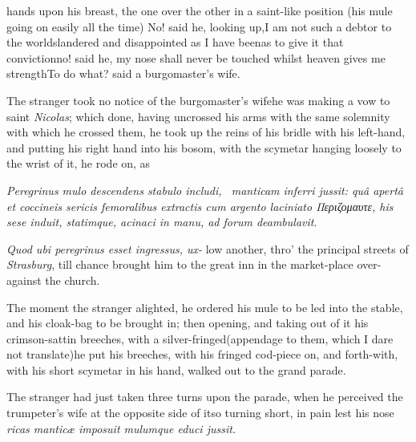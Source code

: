 \documentclass{article}
\begin{document}
\baselineskip
{}

\newpage
\noindent
hands upon his
breast, the one over the other in a
saint-like position (his mule going on easily all the time) No!
said he, looking up,\tsk I am not such a debtor to the
world\tsh slandered and disappointed as I have
been\tsk as to give it that conviction\tsk no! said he,
my nose shall never be touched whilst heaven gives me
strength\tsk To do what? said a burgomaster’s
wife.


The stranger took no notice of the burgomaster’s wife\tsh he was making a vow to
saint \textit{Nicolas}; which done, having uncrossed his arms with the same
solemnity with which he crossed them, he took up the reins of his bridle with his
left-hand, and putting his right hand into his bosom, with the scymetar hanging
loosely to the wrist of it, he rode on, as\break
{}

\null{}\baselineskip
\textit{Peregrinus mulo descendens stabulo includi, \et\ manticam inferri jussit: quâ
aper\-tâ et coccineis sericis femoralibus extractis cum argento laciniato
{\small Περι\-ζο\-μαυτε}, his sese induit, statimque, acinaci in manu, ad forum deambulavit}.

\null{}\baselineskip
\textit{Quod ubi peregrinus esset ingressus, ux-\break
{}
}
low another, thro’ the principal streets of \textit{Strasburg}, till chance
brought him to the great inn in the market-place over-against the church.

The moment the stranger alighted, he ordered his mule to be led into the stable, and
his cloak-bag to be brought in; then opening, and taking out of it his
crimson-sattin breeches, with a silver-fringed\tsk (appendage to them, which I dare
not translate)\tsk he put his breeches, with his fringed cod-piece on, and forth-with,
with his short scymetar in his hand, walked out to the grand parade.

The stranger had just taken three turns upon the parade, when he perceived the
trumpeter’s wife at the opposite side of it\tsk so turning short, in pain lest his
nose 
\textit{ricas manticæ imposuit mulumque educi jussit.}
\end{document}
